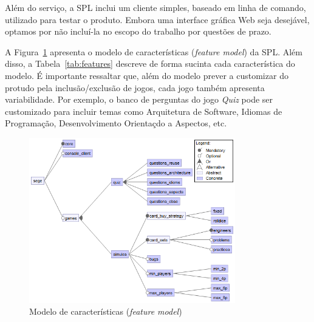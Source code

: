 \documentclass[12pt]{article}
\begin{document}
Além do serviço, a SPL inclui um cliente simples, baseado em linha de comando, utilizado para testar o produto. Embora uma interface gráfica Web seja desejável, optamos por não incluí-la no escopo do trabalho por questões de prazo.

A Figura~\ref{img:feature-model} apresenta o modelo de características (\emph{feature model}) da SPL. Além disso, a Tabela~\ref{tab:features} descreve de forma sucinta cada característica do modelo. É importante ressaltar que, além do modelo prever a customizar do protudo pela inclusão/exclusão de jogos, cada jogo também apresenta variabilidade. Por exemplo, o banco de perguntas do jogo \emph{Quiz} pode ser customizado para incluir temas como Arquitetura de Software, Idiomas de Programação, Desenvolvimento Orientaçdo a Aspectos, etc.

\begin{figure}[htb]
\centering
\includegraphics[width=0.8\textwidth]{img/features.png}
\caption{Modelo de características (\emph{feature model})}
\label{img:feature-model}
\end{figure}
\end{document}
